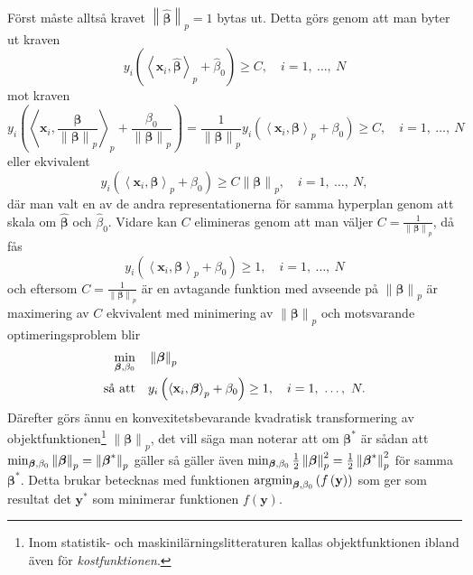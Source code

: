\documentclass[a4paper, 12pt]{report}
\theoremstyle{definition}
\theoremstyle{remark}
\newcommand{\bfbeta}{{\boldsymbol{\beta}}}
\newcommand{\bfx}{\mathbf{x}}
\newcommand{\bfy}{\mathbf{y}}
\newcommand{\llangle}{\left\langle}
\newcommand{\rrangle}{\right\rangle}
\newcommand{\inner}[2]{\llangle #1, #2 \rrangle}
\begin{document}
Först måste alltså kravet $\left\|\widehat{\bfbeta}
\right\|_p=1$ bytas ut. Detta görs genom att man byter ut kraven
\begin{equation*}
y_i\left(\inner{\bfx_i}{\widehat{\bfbeta}}_p+\widehat{\beta}_0\right)\geq C,\quad i=1,~\dots,~N
\end{equation*}
mot kraven
\begin{equation*}
y_i\left(\inner{\bfx_i}{\frac{\bfbeta}{\left\|\bfbeta
\right\|_p}}_p+\frac{\beta_0}{\left\|\bfbeta
\right\|_p}\right) = 
\frac{1}{\left\|\bfbeta
\right\|_p}y_i\left(\inner{\bfx_i}{\bfbeta}_p+\beta_0\right)
 \geq C,\quad i=1,~\dots,~N
\end{equation*}
eller ekvivalent
\begin{equation*}
y_i\left(\inner{\bfx_i}{\bfbeta}_p+\beta_0\right)\geq C\left\|\bfbeta
\right\|_p,\quad i=1,~\dots,~N,
\end{equation*}
där man valt en av de andra representationerna för samma hyperplan genom att skala om $\widehat{\bfbeta}$ och $\widehat{\beta}_0$. Vidare kan $C$ elimineras genom att man väljer $C=\frac{1}{\left\|\bfbeta
\right\|_p}$, då fås
\begin{equation*}
y_i\left(\inner{\bfx_i}{\bfbeta}_p+\beta_0\right)\geq 1,\quad i=1,~\dots,~N
\end{equation*}
och eftersom $C=\frac{1}{\left\|\bfbeta
\right\|_p}$ är en avtagande funktion med avseende på $\left\|\bfbeta
\right\|_p$ är maximering av $C$ ekvivalent med minimering av $\left\|\bfbeta
\right\|_p$ och motsvarande optimeringsproblem blir
\begin{equation*}%
\begin{aligned}
\operatornamewithlimits{min}_{\bfbeta, \beta_0} & & &\left\|\bfbeta
\right\|_p\\
\text{så att} & & &y_i\left(\inner{\bfx_i}{\bfbeta}_p+\beta_0\right)\geq 1,\quad i=1,~\dots,~N.
\end{aligned}
\end{equation*}
Därefter görs ännu en konvexitetsbevarande kvadratisk transformering av objektfunktionen\footnote{Inom statistik- och maskinilärningslitteraturen kallas objektfunktionen ibland även för \textit{kostfunktionen}.} $\left\|\bfbeta\right\|_p$, det vill säga man noterar att om $\bfbeta^*$ är sådan att $\operatornamewithlimits{min}_{\bfbeta, \beta_0} \left\|\bfbeta\right\|_p=\left\|\bfbeta^*\right\|_p$ gäller så gäller även $\operatornamewithlimits{min}_{\bfbeta, \beta_0} \frac{1}{2}\left\|\bfbeta\right\|_p^2=\frac{1}{2}\left\|\bfbeta^*\right\|_p^2$ för samma $\bfbeta^*$.
Detta brukar betecknas med funktionen $\operatornamewithlimits{argmin}_{\bfbeta,\beta_0} \left(f\left(\bfy\right)\right)$ som ger som resultat det $\bfy^*$ som minimerar funktionen $f\left(\bfy\right)$.
\end{document}
